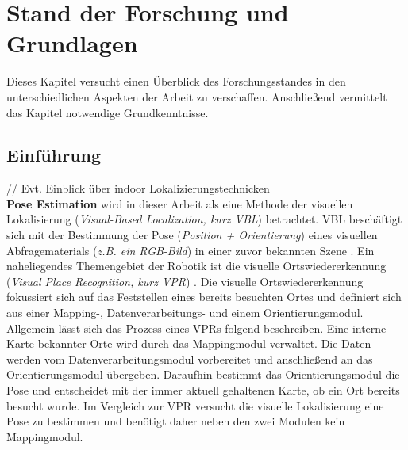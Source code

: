 \pagebreak
\section{Stand der Forschung und Grundlagen}

Dieses Kapitel versucht einen Überblick des Forschungsstandes in den unterschiedlichen Aspekten der Arbeit zu verschaffen. Anschließend vermittelt das Kapitel notwendige Grundkenntnisse.

\subsection{Einführung}



// Evt. Einblick über indoor Lokalizierungstechnicken \\

\textbf{Pose Estimation} wird in dieser Arbeit als eine Methode der visuellen Lokalisierung (\textit{Visual-Based Localization, kurz VBL}) betrachtet. VBL beschäftigt sich mit der Bestimmung der Pose (\textit{Position + Orientierung}) eines visuellen Abfragematerials (\textit{z.B. ein RGB-Bild}) in einer zuvor bekannten Szene  \cite{piascoSurveyVisualBasedLocalization2018}.
Ein naheliegendes Themengebiet der Robotik ist die visuelle Ortswiedererkennung (\textit{Visual Place Recognition, kurz VPR}) \cite{lowryVisualPlaceRecognition2016}. Die visuelle Ortswiedererkennung fokussiert sich auf das Feststellen eines bereits besuchten Ortes und definiert sich aus einer Mapping-, Datenverarbeitungs- und einem Orientierungsmodul. Allgemein lässt sich das Prozess eines VPRs folgend beschreiben. Eine interne Karte bekannter Orte wird durch das Mappingmodul verwaltet. Die Daten werden vom Datenverarbeitungsmodul vorbereitet und anschließend an das Orientierungsmodul übergeben. Daraufhin bestimmt das Orientierungsmodul die Pose und entscheidet mit der immer aktuell gehaltenen Karte, ob ein Ort bereits besucht wurde. Im Vergleich zur VPR versucht die visuelle Lokalisierung eine Pose zu bestimmen und benötigt daher neben den zwei Modulen kein Mappingmodul.

